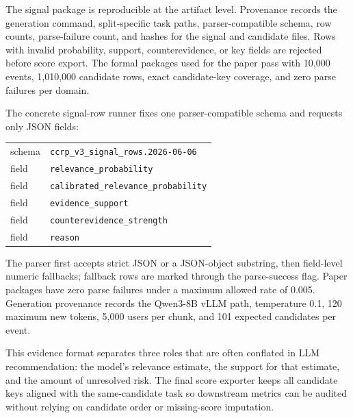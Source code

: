 The signal package is reproducible at the artifact level. Provenance records
the generation command, split-specific task paths, parser-compatible schema,
row counts, parse-failure count, and hashes for the signal and candidate
files. Rows with invalid probability, support, counterevidence, or key fields
are rejected before score export. The formal packages used for the paper pass
with 10,000 events, 1,010,000 candidate rows, exact candidate-key coverage, and
zero parse failures per domain.

The concrete signal-row runner fixes one parser-compatible schema and requests
only JSON fields:
\begin{center}
\small
\begin{tabular}{@{}ll@{}}
schema & \texttt{ccrp\_v3\_signal\_rows.2026-06-06}\\
field & \texttt{relevance\_probability}\\
field & \texttt{calibrated\_relevance\_probability}\\
field & \texttt{evidence\_support}\\
field & \texttt{counterevidence\_strength}\\
field & \texttt{reason}
\end{tabular}
\end{center}
The parser first accepts strict JSON or a JSON-object substring, then
field-level numeric fallbacks; fallback rows are marked through the
parse-success flag. Paper packages have zero parse failures under a maximum
allowed rate of 0.005. Generation provenance records the Qwen3-8B vLLM path,
temperature 0.1, 120 maximum new tokens, 5,000 users per chunk, and 101
expected candidates per event.

This evidence format separates three roles that are often conflated in LLM
recommendation: the model's relevance estimate, the support for that estimate,
and the amount of unresolved risk. The final score exporter keeps all candidate
keys aligned with the same-candidate task so downstream metrics can be audited
without relying on candidate order or missing-score imputation.


